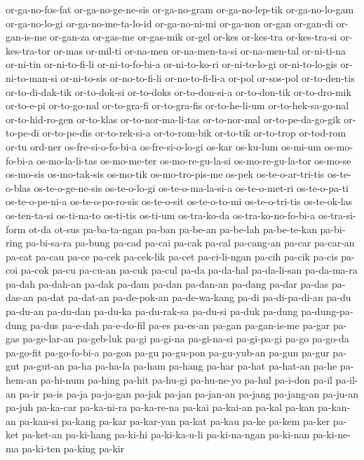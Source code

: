 {or-ga-no-fos-fat or-ga-no-ge-ne-sis or-ga-no-gram or-ga-no-lep-tik
or-ga-no-lo-gam or-ga-no-lo-gi or-ga-no-me-ta-lo-id or-ga-no-ni-mi
or-ga-non or-gan or-gan-di or-gan-is-me or-gan-za or-gas-me or-gas-mik
or-gel or-kes or-kes-tra or-kes-tra-si or-kes-tra-tor or-mas or-mil-ti
or-na-men or-na-men-ta-si or-na-men-tal or-ni-ti-na or-ni-tin
or-ni-to-fi-li or-ni-to-fo-bi-a or-ni-to-ko-ri or-ni-to-lo-gi
or-ni-to-lo-gis or-ni-to-man-si or-ni-to-sis or-no-to-fi-li
or-no-to-fi-li-a or-pol or-sos-pol or-to-den-tis or-to-di-dak-tik
or-to-dok-si or-to-doks or-to-don-si-a or-to-don-tik or-to-dro-mik
or-to-e-pi or-to-go-nal or-to-gra-fi or-to-gra-fis or-to-he-li-um
or-to-hek-sa-go-nal or-to-hid-ro-gen or-to-klas or-to-nor-ma-li-tas
or-to-nor-mal or-to-pe-da-go-gik or-to-pe-di or-to-pe-dis or-to-rek-si-a
or-to-rom-bik or-to-tik or-to-trop or-tod-rom or-tu ord-ner
os-fre-si-o-fo-bi-a os-fre-si-o-lo-gi os-kar os-ku-lum os-mi-um
os-mo-fo-bi-a os-mo-la-li-tas os-mo-me-ter os-mo-re-gu-la-si
os-mo-re-gu-la-tor os-mo-se os-mo-sis os-mo-tak-sis os-mo-tik
os-mo-tro-pis-me os-pek os-te-o-ar-tri-tis os-te-o-blas os-te-o-ge-ne-sis
os-te-o-lo-gi os-te-o-ma-la-si-a os-te-o-met-ri os-te-o-pa-ti
os-te-o-pe-ni-a os-te-o-po-ro-sis os-te-o-sit os-te-o-to-mi
os-te-o-tri-tis os-te-ok-las os-ten-ta-si os-ti-na-to os-ti-tis os-ti-um
os-tra-ko-da os-tra-ko-no-fo-bi-a os-tra-si-form ot-da ot-sus
pa-ba-ta-ngan pa-ban pa-be-an pa-be-lah pa-be-te-kan pa-bi-ring
pa-bi-sa-ra pa-bung pa-cad pa-cai pa-cak pa-cal pa-cang-an pa-car
pa-car-an pa-cat pa-cau pa-ce pa-cek pa-cek-lik pa-cet pa-ci-li-ngan
pa-cih pa-cik pa-cis pa-coi pa-cok pa-cu pa-cu-an pa-cuk pa-cul pa-da
pa-da-hal pa-da-li-san pa-da-ma-ra pa-dah pa-dah-an pa-dak pa-dam pa-dan
pa-dan-an pa-dang pa-dar pa-das pa-das-an pa-dat pa-dat-an pa-de-pok-an
pa-de-wa-kang pa-di pa-di-pa-di-an pa-du pa-du-an pa-du-dan pa-du-ka
pa-du-rak-sa pa-du-si pa-duk pa-dung pa-dung-pa-dung pa-dus pa-e-dah
pa-e-do-fil pa-es pa-es-an pa-gan pa-gan-is-me pa-gar pa-gas pa-ge-lar-an
pa-geb-luk pa-gi pa-gi-na pa-gi-na-si pa-gi-pa-gi pa-go pa-go-da pa-go-fit
pa-go-fo-bi-a pa-gon pa-gu pa-gu-pon pa-gu-yub-an pa-gun pa-gur pa-gut
pa-gut-an pa-ha pa-ha-la pa-ham pa-hang pa-har pa-hat pa-hat-an pa-he
pa-hem-an pa-hi-num pa-hing pa-hit pa-hu-gi pa-hu-ne-yo pa-hul pa-i-don
pa-il pa-il-an pa-ir pa-is pa-ja pa-ja-gan pa-jak pa-jan pa-jan-an pa-jang
pa-jang-an pa-ju-an pa-juh pa-ka-car pa-ka-ni-ra pa-ka-re-na pa-kai
pa-kai-an pa-kal pa-kan pa-kan-an pa-kan-si pa-kang pa-kar pa-kar-yan
pa-kat pa-kau pa-ke pa-kem pa-ker pa-ket pa-ket-an pa-ki-hang pa-ki-hi
pa-ki-ka-u-li pa-ki-na-ngan pa-ki-nan pa-ki-ne-ma pa-ki-ten pa-king pa-kir
}
